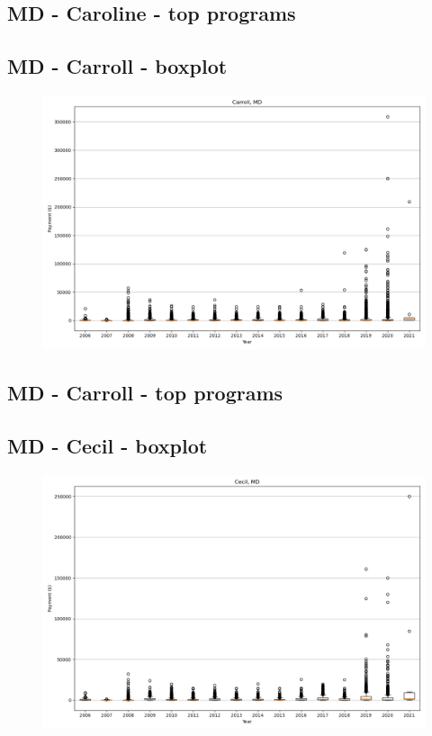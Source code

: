 \subsection*{MD - Caroline - top programs}

\newpage
\subsection*{MD - Carroll - boxplot}
\begin{figure}[h]
\centering
\includegraphics[width=7in]{../output/boxplots/counties/Carroll-MD_boxplot.png}
\end{figure}


\subsection*{MD - Carroll - top programs}

\newpage
\subsection*{MD - Cecil - boxplot}
\begin{figure}[h]
\centering
\includegraphics[width=7in]{../output/boxplots/counties/Cecil-MD_boxplot.png}
\end{figure}


